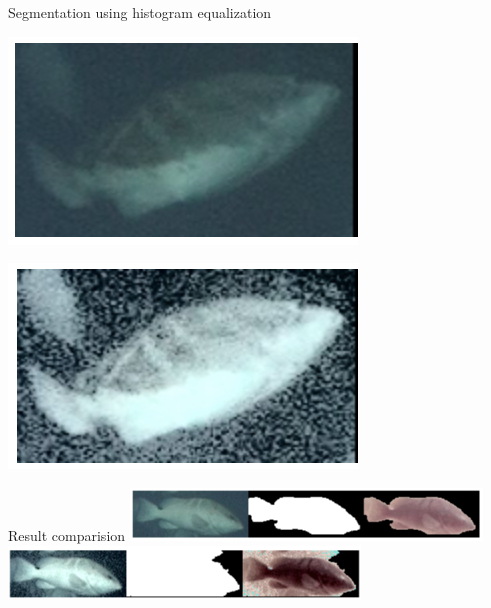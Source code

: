 \begin{frame}{Segmentation using histogram equalization}
    \begin{minipage}{0.5\textwidth}
        \centering
        \includegraphics[width=\textwidth,keepaspectratio]{images/gm4-4.png}
    \end{minipage}%
    \begin{minipage}{0.5\textwidth}
        \centering
        \includegraphics[width=\textwidth,keepaspectratio]{images/gm4-3.png}
    \end{minipage}
\end{frame}

\begin{frame}{Result comparision}
    \centering
      \includegraphics[height=0.7\textheight,width=0.7\textwidth,keepaspectratio]{images/gm4-5.png}
      \includegraphics[height=0.7\textheight,width=0.7\textwidth,keepaspectratio]{images/gm4-6.png}

   
\end{frame}

